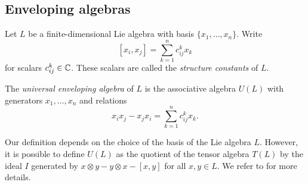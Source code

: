     
    
    
    
    

\subsection{Enveloping algebras}

Let $L$ be a finite-dimensional Lie algebra with
basis $\{x_1,\dots,x_n\}$. Write
\[
[x_i,x_j]=\sum_{k=1}^n c^k_{ij}x_k
\]
for scalars $c_{ij}^k\in\mathbb{C}$. 
These scalars are called 
the \emph{structure constants} of $L$. 

The \emph{universal enveloping algebra} of $L$ 
is the associative algebra $U(L)$ with generators 
$x_1,\dots,x_n$ and relations 
\[
x_ix_j-x_jx_i=\sum_{k=1}^n c_{ij}^kx_k.
\]

Our definition depends on the choice of the basis of the Lie algebra $L$. 
However, it is possible to define $U(L)$ as the quotient 
of the tensor algebra $T(L)$ by the ideal $I$ 
generated by $x\otimes y-y\otimes x-[x,y]$ for all $x,y\in L$.  We refer 
to \cite[Chapter V]{MR1321145} for more details. 

